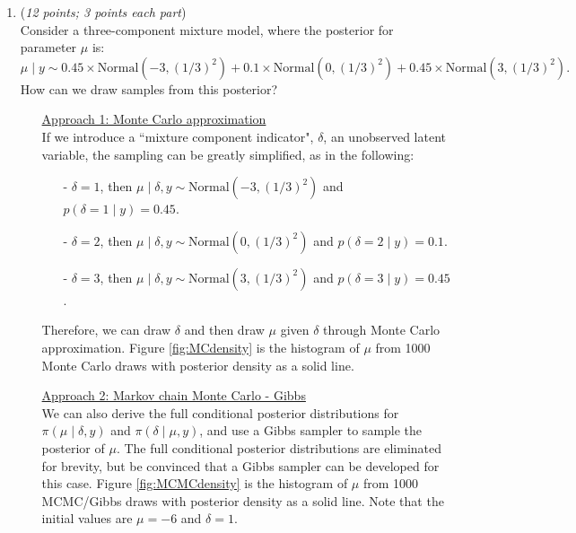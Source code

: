 \documentclass[11pt]{article}
\begin{document}
\begin{enumerate}
\begin{enumerate}
\end{enumerate}



 \item
    ({\it{12 points; 3 points each part}}) \\
    Consider a three-component mixture model, where the posterior for parameter $\mu$ is:
    \begin{equation}
    \mu \mid y \sim 0.45 \times \textrm{Normal}(-3, (1/3)^2) + 0.1 \times \textrm{Normal}(0, (1/3)^2) + 0.45 \times \textrm{Normal}(3, (1/3)^2).
    \label{eq:postmu}
    \end{equation}
    How can we draw samples from this posterior? 
    
    \begin{itemize}
    \item[] {\underline{Approach 1: Monte Carlo approximation}}\\
    If we introduce a ``mixture component indicator", $\delta$, an unobserved latent variable, the sampling can be greatly simplified, as in the following:
    \begin{itemize}
    \item[-] $\delta = 1$, then $\mu \mid \delta, y \sim \textrm{Normal}(-3, (1/3)^2)$ and $p(\delta = 1 \mid y) = 0.45$.
    \item[-] $\delta = 2$, then $\mu \mid \delta, y \sim \textrm{Normal}(0, (1/3)^2)$ and $p(\delta = 2 \mid y) = 0.1$.
    \item[-] $\delta = 3$, then $\mu \mid \delta, y \sim \textrm{Normal}(3, (1/3)^2)$ and $p(\delta = 3 \mid y) = 0.45$.
    \end{itemize}
    Therefore, we can draw $\delta$ and then draw $\mu$ given $\delta$ through Monte Carlo approximation. Figure \ref{fig:MCdensity} is the histogram of $\mu$ from 1000 Monte Carlo draws with posterior density as a solid line.
    
    
        \item[] {\underline{Approach 2: Markov chain Monte Carlo - Gibbs}}\\
    We can also derive the full conditional posterior distributions for $\pi(\mu \mid \delta, y)$ and $\pi(\delta \mid \mu, y)$, and use a Gibbs sampler to sample the posterior of $\mu$. The full conditional posterior distributions are eliminated for brevity, but be convinced that a Gibbs sampler can be developed for this case. Figure \ref{fig:MCMCdensity} is the histogram of $\mu$ from 1000 MCMC/Gibbs draws with posterior density as a solid line. Note that the initial values are $\mu = -6$ and $\delta = 1$.




\end{itemize}
\end{enumerate}
\end{document}
